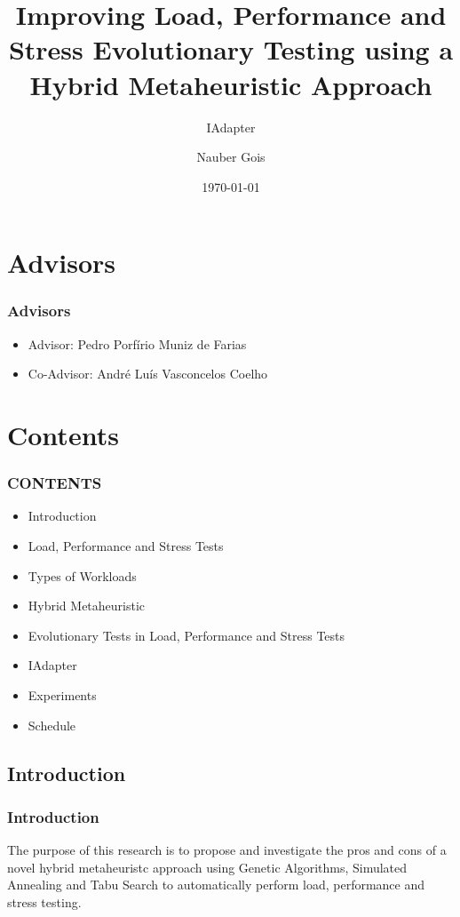 \documentclass{beamer}
\title{Improving Load, Performance and Stress Evolutionary Testing using a Hybrid Metaheuristic Approach}
\subtitle{IAdapter}
\author{Nauber Gois}
\date{\today}
\institute{\url{naubergois@gmail.com}\\\url{http://www.unifor.br/}}
\begin{document}
\begin{frame}[t]
\titlepage
\end{frame}



\section{Advisors}
\begin{frame}
\frametitle{Advisors}
\large{
\begin{itemize}
\item Advisor: Pedro Porfírio Muniz de Farias
\item Co-Advisor: André Luís Vasconcelos Coelho
\end{itemize}
}
\end{frame}


\section{Contents}
\begin{frame}
\frametitle{CONTENTS}
\begin{itemize}
\item Introduction
\item Load, Performance and Stress Tests
\item Types of Workloads
\item Hybrid Metaheuristic
\item Evolutionary Tests in Load, Performance and Stress Tests
\item IAdapter
\item Experiments
\item Schedule
\end{itemize}
\end{frame}

\subsection{Introduction}
\begin{frame}
\frametitle{Introduction}
The purpose of this research is to propose and investigate the pros and cons of a novel hybrid metaheuristc approach using  Genetic Algorithms, Simulated Annealing and Tabu Search to automatically perform load, performance and stress testing.
\end{frame}
\end{document}
